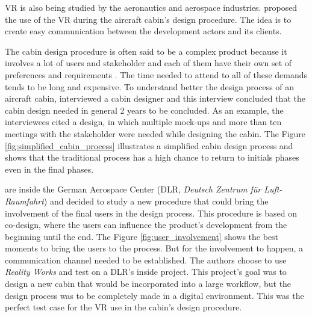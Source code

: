 
VR is also being studied by the aeronautics and aerospace industries. \citeauthor{moerland2021application} proposed the use of the VR during the aircraft cabin's design procedure. The idea is to create easy communication between the development actors and its clients.

The cabin design procedure is often said to be a complex product because it involves a lot of users and stakeholder and each of them have their own set of preferences and requirements \citeauthor{moerland2021application}. The time needed to attend to all of these demands tends to be long and expensive. To understand better the design process of an aircraft cabin, \citeauthor{moerland2021application} interviewed a cabin designer and this interview concluded that the cabin design needed in general 2 years to be concluded. As an example, the interviewees cited a design, in which multiple mock-ups and more than ten meetings with the stakeholder were needed while designing the cabin. The Figure \ref{fig:simplified_cabin_process} illustrates a simplified cabin design process and shows that the traditional process has a high chance to return to initials phases even in the final phases.






\citeauthor{moerland2021application} are inside the German Aerospace Center (DLR, \textit{Deutsch Zentrum für Luft- Raumfahrt}) and decided to study a new procedure that could bring the involvement of the final users in the design process. This procedure is based on co-design, where the users can influence the product's development from the beginning until the end. The Figure \ref{fig:user_involvement} shows the best moments to bring the users to the process. But for the involvement to happen, a communication channel needed to be established. The authors choose to use \textit{Reality Works} and test on a DLR's inside project. This project's goal was to design a new cabin that would be incorporated into a large workflow, but the design process was to be completely made in a digital environment. This was the perfect test case for the VR use in the cabin's design procedure.

